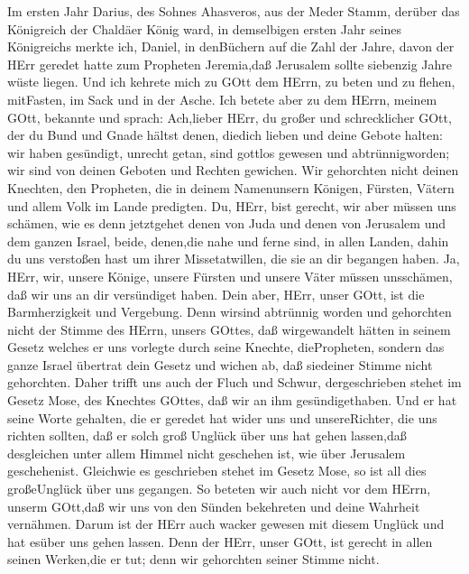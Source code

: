  Im ersten Jahr Darius, des Sohnes Ahasveros, aus der Meder
Stamm, derüber das Königreich der Chaldäer König ward,  in
demselbigen ersten Jahr seines Königreichs merkte ich, Daniel, in
denBüchern auf die Zahl der Jahre, davon der HErr geredet hatte zum
Propheten Jeremia,daß Jerusalem sollte siebenzig Jahre wüste liegen.
 Und ich kehrete mich zu GOtt dem HErrn, zu beten und zu
flehen, mitFasten, im Sack und in der Asche.  Ich betete
aber zu dem HErrn, meinem GOtt, bekannte und sprach: Ach,lieber HErr, du
großer und schrecklicher GOtt, der du Bund und Gnade hältst denen,
diedich lieben und deine Gebote halten:  wir haben
gesündigt, unrecht getan, sind gottlos gewesen und abtrünnigworden; wir
sind von deinen Geboten und Rechten gewichen.  Wir
gehorchten nicht deinen Knechten, den Propheten, die in deinem
Namenunsern Königen, Fürsten, Vätern und allem Volk im Lande predigten.
 Du, HErr, bist gerecht, wir aber müssen uns schämen, wie es
denn jetztgehet denen von Juda und denen von Jerusalem und dem ganzen
Israel, beide, denen,die nahe und ferne sind, in allen Landen, dahin du
uns verstoßen hast um ihrer Missetatwillen, die sie an dir begangen
haben.  Ja, HErr, wir, unsere Könige, unsere Fürsten und
unsere Väter müssen unsschämen, daß wir uns an dir versündiget haben.
 Dein aber, HErr, unser GOtt, ist die Barmherzigkeit und
Vergebung. Denn wirsind abtrünnig worden  und gehorchten
nicht der Stimme des HErrn, unsers GOttes, daß wirgewandelt hätten in
seinem Gesetz welches er uns vorlegte durch seine Knechte, diePropheten,
 sondern das ganze Israel übertrat dein Gesetz und wichen
ab, daß siedeiner Stimme nicht gehorchten. Daher trifft uns auch der
Fluch und Schwur, dergeschrieben stehet im Gesetz Mose, des Knechtes
GOttes, daß wir an ihm gesündigethaben.  Und er hat seine
Worte gehalten, die er geredet hat wider uns und unsereRichter, die uns
richten sollten, daß er solch groß Unglück über uns hat gehen lassen,daß
desgleichen unter allem Himmel nicht geschehen ist, wie über Jerusalem
geschehenist.  Gleichwie es geschrieben stehet im Gesetz
Mose, so ist all dies großeUnglück über uns gegangen. So beteten wir
auch nicht vor dem HErrn, unserm GOtt,daß wir uns von den Sünden
bekehreten und deine Wahrheit vernähmen.  Darum ist der
HErr auch wacker gewesen mit diesem Unglück und hat esüber uns gehen
lassen. Denn der HErr, unser GOtt, ist gerecht in allen seinen
Werken,die er tut; denn wir gehorchten seiner Stimme nicht.
